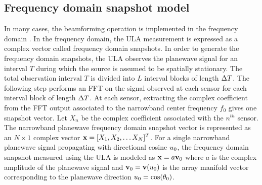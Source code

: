 \subsection{Frequency domain snapshot model}
\label{sec:freq-snapshot}
In many cases, the beamforming operation is implemented in the frequency
domain \cite[Sec.~5.2.1]{vtree2002oap}. In the frequency domain, the ULA
measurement is expressed as a complex vector called frequency domain
snapshots. In order to generate the frequency domain snapshots, the
ULA observes the planewave signal for an interval $T$ during which the
source is assumed to be spatially stationary. The total observation
interval $T$ is divided into $L$ interval blocks of length
$\Delta T$. The following step performs an FFT on the signal observed
at each sensor for each interval block of length $\Delta T$. At each sensor, extracting the
complex coefficient from the FFT output associated to the narrowband
center frequency $f_0$ gives one snapshot vector. Let $X_n$ be the
complex coefficient associated with the $n^{th}$ sensor. The
narrowband planewave frequency domain snapshot vector is represented
as an $N \times 1$ complex vector ${\bf x} = [X_1,X_2,\ldots X_N]^T$. For a
single narrowband planewave signal propagating with directional cosine
$u_0$, the frequency domain snapshot measured using the ULA is
modeled as ${\bf x} = a{\bf v}_0$ where $a$ is the complex amplitude of
the planewave signal and ${\bf v}_0 = {\bf v}(u_0)$ is the array manifold vector
corresponding to the planewave direction $u_0 = \cos(\theta_0)$.


